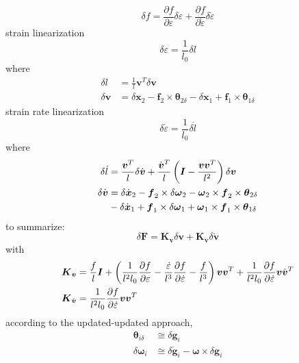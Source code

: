 \documentclass[10pt,dvips,fleqn]{report}
\newcommand{\T}[1]{\boldsymbol{#1}}
\begin{document}
\begin{equation}
	\delta{f} = \frac{\partial{f}}{\partial\varepsilon} \delta\varepsilon
	+ \frac{\partial{f}}{\partial\dot{\varepsilon}} \delta\dot{\varepsilon}
\end{equation}
strain linearization
\begin{equation}
	\delta\varepsilon = \frac{1}{l_0}\delta{l}
\end{equation}
where
\begin{align}
	\delta{l} &= \frac{1}{l}\T{v}^T \delta\T{v} \\
	\delta\T{v} &= \delta\T{x}_2 - \T{f}_2 \times \T{\theta}_{2\delta}
		- \delta\T{x}_1 + \T{f}_1 \times \T{\theta}_{1\delta}
\end{align}
strain rate linearization
\begin{equation}
	\delta\dot{\varepsilon} = \frac{1}{l_0} \delta\dot{l}
\end{equation}
where
\begin{align}
	\delta\dot{l} &= \frac{\T{v}^T}{l} \delta\dot{\T{v}}
		+ \frac{\dot{\T{v}}^T}{l}\plbr{\T{I} - \frac{\T{v}\T{v}^T}{l^2}} \delta\T{v} \\
	\delta\dot{\T{v}} &= \delta\dot{\T{x}}_2
		- \T{f}_2 \times \delta\T{\omega}_2 - \T{\omega}_2 \times \T{f}_2 \times \T{\theta}_{2\delta}
		\nonumber \\
		& \mbox{} - \delta\dot{\T{x}}_1
		+ \T{f}_1 \times \delta\T{\omega}_1 + \T{\omega}_1 \times \T{f}_1 \times \T{\theta}_{1\delta}
\end{align}
to summarize:
\begin{equation}
	\delta\T{F} = \T{K}_{\T{v}} \delta\T{v} + \T{K}_{\dot{\T{v}}} \delta\dot{\T{v}}
\end{equation}
with
\begin{align}
	\T{K}_{\T{v}} &= \frac{f}{l} \T{I}
		+ \plbr{
			\frac{1}{l^2 l_0} \frac{\partial{f}}{\partial\varepsilon}
			- \frac{\dot{\varepsilon}}{l^3} \frac{\partial{f}}{\partial\dot{\varepsilon}}
			- \frac{f}{l^3}
		}\T{v}\T{v}^T
		+ \frac{1}{l^2 l_0} \frac{\partial{f}}{\partial\dot{\varepsilon}} \T{v}\dot{\T{v}}^T \\
	\T{K}_{\dot{\T{v}}} &= \frac{1}{l^2 l_0} \frac{\partial{f}}{\partial\dot{\varepsilon}} \T{v}\T{v}^T
\end{align}
according to the updated-updated approach,
\begin{align}
	\T{\theta}_{i\delta} &\cong \delta\T{g}_i \\
	\delta\T{\omega}_i &\cong \delta\dot{\T{g}}_i - \T{\omega}\times\delta\T{g}_i
\end{align}
\end{document}
